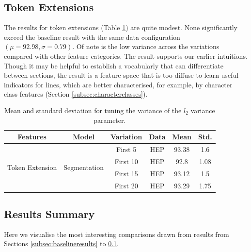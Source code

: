 \subsection{Token Extensions}
\label{subsec:tokenextensionresults}

The results for token extensions (Table \ref{table:tokenextensions}) are quite modest. None significantly exceed the baseline result with the same data configuration $(\mu = 92.98, \sigma = 0.79)$. Of note is the low variance across the variations compared with other feature categories. The result supports our earlier intuitions. Though it may be helpful to establish a vocabularly that can differentiate between sections, the result is a feature space that is too diffuse to learn useful indicators for lines, which are better characterised, for example, by character class features (Section \ref{subsec:characterclasses}).

\begin{table}[h]
\begin{center}
\begin{tabular}{|c|c|c|c|c|c|}
\hline
Features & Model & Variation & Data & Mean & Std.\\
\hline
\multirow{4}{*}{Token Extension} & \multirow{4}{*}{Segmentation} & First 5 & HEP & 93.38 & 1.6\\\cline{3-6}
& & First 10 & HEP & 92.8 & 1.08\\\cline{3-6}
& & First 15 & HEP & 93.12 & 1.5\\\cline{3-6}
& & First 20 & HEP & 93.29 & 1.75\\\cline{3-6}
\hline
\end{tabular}
\caption[Mean and standard deviation for tuning the variance of the $l_2$ variance parameter.]{Mean and standard deviation for tuning the variance of the $l_2$ variance parameter.}
\label{table:tokenextensions}
\end{center}
\end{table}

\subsection{Results Summary}

Here we visualise the most interesting comparisons drawn from results from Sections \ref{subsec:baselineresults} to \ref{subsec:tokenextensionresults}.

